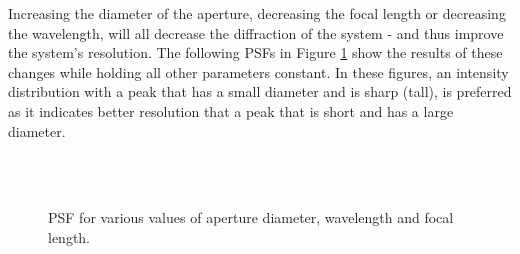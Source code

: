 Increasing the diameter of the aperture, decreasing the focal length or decreasing the wavelength, will all decrease the diffraction of the system - and thus improve the system's resolution.  The following PSFs in Figure \ref{fig:VaryParams} show the results of these changes while holding all other parameters constant.  In these figures, an intensity distribution with a peak that has a small diameter and is sharp (tall), is preferred as it indicates better resolution that a peak that is short and has a large diameter.  

\begin{figure}[H]
    \hfill
	 \\
   	
   	\hfill
	\\
   	
   	\hfill
	\caption{PSF for various values of aperture diameter, wavelength and focal length. }
	\label{fig:VaryParams}
\end{figure}



